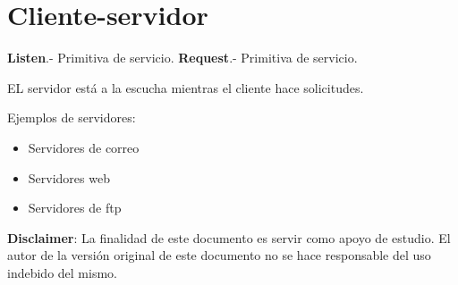 \documentclass{article}
\begin{document}
\section{Cliente-servidor}

\textbf{Listen}.- Primitiva de servicio.
\textbf{Request}.- Primitiva de servicio.

EL servidor está a la escucha mientras el cliente hace solicitudes.

Ejemplos de servidores:

\begin{itemize}
	\item
	Servidores de correo
	\item
	Servidores web
	\item
	Servidores de ftp
\end{itemize}

\textbf{Disclaimer}: La finalidad de este documento es servir como apoyo de estudio.
El autor de la versión original de este documento no se hace responsable del
uso indebido del mismo.
\end{document}
